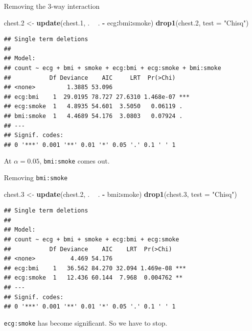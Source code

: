 \documentclass[ignorenonframetext,]{beamer}
\newenvironment{Shaded}{\begin{snugshade}}{\end{snugshade}}
\newcommand{\DataTypeTok}[1]{\textcolor[rgb]{0.13,0.29,0.53}{#1}}
\newcommand{\FloatTok}[1]{\textcolor[rgb]{0.00,0.00,0.81}{#1}}
\newcommand{\KeywordTok}[1]{\textcolor[rgb]{0.13,0.29,0.53}{\textbf{#1}}}
\newcommand{\NormalTok}[1]{#1}
\newcommand{\OperatorTok}[1]{\textcolor[rgb]{0.81,0.36,0.00}{\textbf{#1}}}
\newcommand{\StringTok}[1]{\textcolor[rgb]{0.31,0.60,0.02}{#1}}
\begin{document}
\begin{frame}[fragile]{Removing the 3-way interaction}
\protect\hypertarget{removing-the-3-way-interaction}{}

\begin{Shaded}
\begin{Highlighting}[]
\NormalTok{chest}\FloatTok{.2}\NormalTok{ <-}\StringTok{ }\KeywordTok{update}\NormalTok{(chest}\FloatTok{.1}\NormalTok{, . }\OperatorTok{~}\StringTok{ }\NormalTok{. }\OperatorTok{-}\StringTok{ }\NormalTok{ecg}\OperatorTok{:}\NormalTok{bmi}\OperatorTok{:}\NormalTok{smoke)}
\KeywordTok{drop1}\NormalTok{(chest}\FloatTok{.2}\NormalTok{, }\DataTypeTok{test =} \StringTok{"Chisq"}\NormalTok{)}
\end{Highlighting}
\end{Shaded}

\begin{verbatim}
## Single term deletions
## 
## Model:
## count ~ ecg + bmi + smoke + ecg:bmi + ecg:smoke + bmi:smoke
##           Df Deviance    AIC     LRT  Pr(>Chi)    
## <none>         1.3885 53.096                      
## ecg:bmi    1  29.0195 78.727 27.6310 1.468e-07 ***
## ecg:smoke  1   4.8935 54.601  3.5050   0.06119 .  
## bmi:smoke  1   4.4689 54.176  3.0803   0.07924 .  
## ---
## Signif. codes:  
## 0 '***' 0.001 '**' 0.01 '*' 0.05 '.' 0.1 ' ' 1
\end{verbatim}

At \(\alpha=0.05\), \texttt{bmi:smoke} comes out.

\end{frame}

\begin{frame}[fragile]{Removing \texttt{bmi:smoke}}
\protect\hypertarget{removing-bmismoke}{}

\begin{Shaded}
\begin{Highlighting}[]
\NormalTok{chest}\FloatTok{.3}\NormalTok{ <-}\StringTok{ }\KeywordTok{update}\NormalTok{(chest}\FloatTok{.2}\NormalTok{, . }\OperatorTok{~}\StringTok{ }\NormalTok{. }\OperatorTok{-}\StringTok{ }\NormalTok{bmi}\OperatorTok{:}\NormalTok{smoke)}
\KeywordTok{drop1}\NormalTok{(chest}\FloatTok{.3}\NormalTok{, }\DataTypeTok{test =} \StringTok{"Chisq"}\NormalTok{)}
\end{Highlighting}
\end{Shaded}

\begin{verbatim}
## Single term deletions
## 
## Model:
## count ~ ecg + bmi + smoke + ecg:bmi + ecg:smoke
##           Df Deviance    AIC    LRT  Pr(>Chi)    
## <none>          4.469 54.176                     
## ecg:bmi    1   36.562 84.270 32.094 1.469e-08 ***
## ecg:smoke  1   12.436 60.144  7.968  0.004762 ** 
## ---
## Signif. codes:  
## 0 '***' 0.001 '**' 0.01 '*' 0.05 '.' 0.1 ' ' 1
\end{verbatim}

\texttt{ecg:smoke} has become significant. So we have to stop.

\end{frame}
\end{document}
